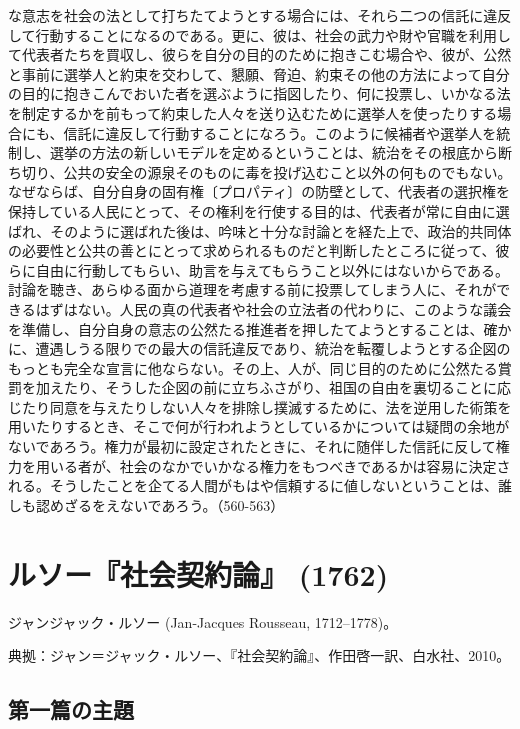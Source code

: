 な意志を社会の法として打ちたてようとする場合には、それら二つの信託に違反して行動することになるのである。更に、彼は、社会の武力や財や官職を利用して代表者たちを買収し、彼らを自分の目的のために抱きこむ場合や、彼が、公然と事前に選挙人と約束を交わして、懇願、脅迫、約束その他の方法によって自分の目的に抱きこんでおいた者を選ぶように指図したり、何に投票し、いかなる法を制定するかを前もって約束した人々を送り込むために選挙人を使ったりする場合にも、信託に違反して行動することになろう。このように候補者や選挙人を統制し、選挙の方法の新しいモデルを定めるということは、統治をその根底から断ち切り、公共の安全の源泉そのものに毒を投げ込むこと以外の何ものでもない。なぜならば、自分自身の固有権〔プロパティ〕の防壁として、代表者の選択権を保持している人民にとって、その権利を行使する目的は、代表者が常に自由に選ばれ、そのように選ばれた後は、吟味と十分な討論とを経た上で、政治的共同体の必要性と公共の善とにとって求められるものだと判断したところに従って、彼らに自由に行動してもらい、助言を与えてもらうこと以外にはないからである。討論を聴き、あらゆる面から道理を考慮する前に投票してしまう人に、それができるはずはない。人民の真の代表者や社会の立法者の代わりに、このような議会を準備し、自分自身の意志の公然たる推進者を押したてようとすることは、確かに、遭遇しうる限りでの最大の信託違反であり、統治を転覆しようとする企図のもっとも完全な宣言に他ならない。その上、人が、同じ目的のために公然たる賞罰を加えたり、そうした企図の前に立ちふさがり、祖国の自由を裏切ることに応じたり同意を与えたりしない人々を排除し撲滅するために、法を逆用した術策を用いたりするとき、そこで何が行われようとしているかについては疑問の余地がないであろう。権力が最初に設定されたときに、それに随伴した信託に反して権力を用いる者が、社会のなかでいかなる権力をもつべきであるかは容易に決定される。そうしたことを企てる人間がもはや信頼するに値しないということは、誰しも認めざるをえないであろう。（560-563）




\section{ルソー『社会契約論』 (1762)}

ジャンジャック・ルソー (Jan-Jacques Rousseau, 1712--1778)。

典拠：ジャン＝ジャック・ルソー、『社会契約論』、作田啓一訳、白水社、2010。

\subsection{第一篇の主題}



